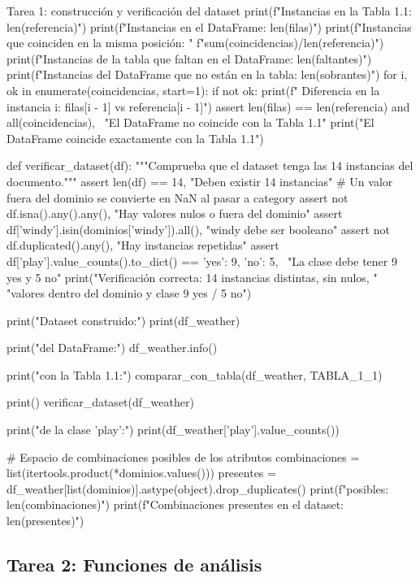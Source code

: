 \documentclass[11pt,letterpaper]{article}
\begin{document}
\begin{codigo}[label=cod:tarea1]{Tarea 1: construcción y verificación del dataset}
    print(f"Instancias en la Tabla 1.1: {len(referencia)}")
    print(f"Instancias en el DataFrame: {len(filas)}")
    print(f"Instancias que coinciden en la misma posición: "
          f"{sum(coincidencias)}/{len(referencia)}")
    print(f"Instancias de la tabla que faltan en el DataFrame: {len(faltantes)}")
    print(f"Instancias del DataFrame que no están en la tabla: {len(sobrantes)}")
    for i, ok in enumerate(coincidencias, start=1):
        if not ok:
            print(f"  Diferencia en la instancia {i}: {filas[i - 1]} vs {referencia[i - 1]}")
    assert len(filas) == len(referencia) and all(coincidencias), \
        "El DataFrame no coincide con la Tabla 1.1"
    print("El DataFrame coincide exactamente con la Tabla 1.1")


def verificar_dataset(df):
    """Comprueba que el dataset tenga las 14 instancias del documento."""
    assert len(df) == 14, "Deben existir 14 instancias"
    # Un valor fuera del dominio se convierte en NaN al pasar a category
    assert not df.isna().any().any(), "Hay valores nulos o fuera del dominio"
    assert df['windy'].isin(dominios['windy']).all(), "windy debe ser booleano"
    assert not df.duplicated().any(), "Hay instancias repetidas"
    assert df['play'].value_counts().to_dict() == {'yes': 9, 'no': 5}, \
        "La clase debe tener 9 yes y 5 no"
    print("Verificación correcta: 14 instancias distintas, sin nulos, "
          "valores dentro del dominio y clase 9 yes / 5 no")


print("Dataset construido:")
print(df_weather)

print("\nEstructura del DataFrame:")
df_weather.info()

print(" con la Tabla 1.1:")
comparar_con_tabla(df_weather, TABLA_1_1)

print()
verificar_dataset(df_weather)

print(" de la clase 'play':")
print(df_weather['play'].value_counts())

# Espacio de combinaciones posibles de los atributos
combinaciones = list(itertools.product(*dominios.values()))
presentes = df_weather[list(dominios)].astype(object).drop_duplicates()
print(f"\nCombinaciones posibles: {len(combinaciones)}")
print(f"Combinaciones presentes en el dataset: {len(presentes)}")
\end{codigo}

\subsection{Tarea 2: Funciones de análisis}
\end{document}
